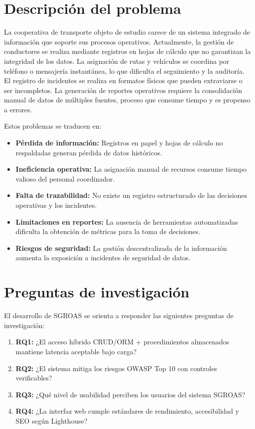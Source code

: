 \section{Descripción del problema}
\label{sec:problema}

La cooperativa de transporte objeto de estudio carece de un sistema integrado de información que soporte sus procesos operativos. Actualmente, la gestión de conductores se realiza mediante registros en hojas de cálculo que no garantizan la integridad de los datos. La asignación de rutas y vehículos se coordina por teléfono o mensajería instantánea, lo que dificulta el seguimiento y la auditoría. El registro de incidentes se realiza en formatos físicos que pueden extraviarse o ser incompletos. La generación de reportes operativos requiere la consolidación manual de datos de múltiples fuentes, proceso que consume tiempo y es propenso a errores.

Estos problemas se traducen en:
\begin{itemize}
  \item \textbf{Pérdida de información:} Registros en papel y hojas de cálculo no respaldadas generan pérdida de datos históricos.
  \item \textbf{Ineficiencia operativa:} La asignación manual de recursos consume tiempo valioso del personal coordinador.
  \item \textbf{Falta de trazabilidad:} No existe un registro estructurado de las decisiones operativas y los incidentes.
  \item \textbf{Limitaciones en reportes:} La ausencia de herramientas automatizadas dificulta la obtención de métricas para la toma de decisiones.
  \item \textbf{Riesgos de seguridad:} La gestión descentralizada de la información aumenta la exposición a incidentes de seguridad de datos.
\end{itemize}

\section{Preguntas de investigación}
\label{sec:preguntas}

El desarrollo de SGROAS se orienta a responder las siguientes preguntas de investigación:

\begin{enumerate}
  \item \textbf{RQ1:} ¿El acceso híbrido CRUD/ORM + procedimientos almacenados mantiene latencia aceptable bajo carga?

  \item \textbf{RQ2:} ¿El sistema mitiga los riesgos OWASP Top 10 con controles verificables?

  \item \textbf{RQ3:} ¿Qué nivel de usabilidad perciben los usuarios del sistema SGROAS?

  \item \textbf{RQ4:} ¿La interfaz web cumple estándares de rendimiento, accesibilidad y SEO según Lighthouse?
\end{enumerate}


